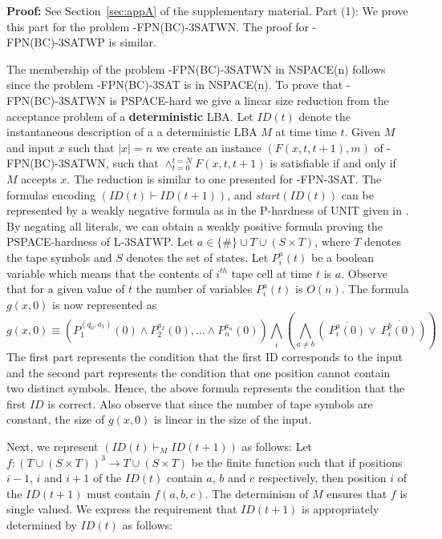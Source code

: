 \noindent
{\bf Proof:} See Section~\ref{sec:appA} of the supplementary material.
\iffalse
Part (1):
We prove  this part for the problem {-FPN(BC)-3SATWN}. 
The proof for {-FPN(BC)-3SATWP} is similar.


The membership of the problem {-FPN(BC)-3SATWN} in {\sf NSPACE(n)} 
follows since the problem {-FPN(BC)-3SAT} is in {\sf NSPACE(n)}.  
To prove that {-FPN(BC)-3SATWN} is {\sf PSPACE}-hard we give a linear size
reduction from the acceptance problem of a {\bf deterministic} {\sf LBA}.
Let $ID(t)$ denote the  instantaneous description of a
a deterministic {\sf LBA} $M$ at time time $t$.
Given $M$ and input $x$ such that $|x| = n$ we create
an instance $(F(x,t,t+1),m)$ of {-FPN(BC)-3SATWN}, such that 
$\wedge_{t = 0}^{t = N} F(x, t, t+1)$ is 
satisfiable if and only if $M$ accepts $x$. 
The reduction is similar to one presented for  {-FPN-3SAT}. 
The formulas encoding $(ID(t) \vdash ID(t+1))$, and $start(ID(t))$
can  be represented by a weakly negative formula
as in the {\sf P}-hardness of {\sf UNIT} given in \cite{JL77}. 
By negating all literals, we can 
obtain a weakly positive formula proving the {\sf PSPACE}-hardness of 
{\sf L-3SATWP}. Let $a \in \{ \# \} \cup T \cup  (S \times T)$, where 
$T$ denotes the tape symbols and $S$ denotes the set of states. 
Let $P^a_i(t)$ be a boolean variable which means that the contents
of $i^{th}$ tape cell at time $t$ is $a$. Observe that for a given value of $t$
the number of variables $P^a_i(t)$ is $O(n)$. 
The formula $g(x,0)$ is now represented as
\[g(x, 0) \equiv 
\left( P_{1}^{(q_0,a_1)}(0) \wedge P_{2}^{a_2}(0),\ldots \wedge 
P_{n}^{a_n}(0) \right) \bigwedge_{i} \left(\bigwedge_{a \neq b} 
(~\overline{P_{i}^a(0)} \vee  ~\overline{P_{i}^b(0)}) \right)\]
The first part represents the condition that the first ID corresponds to the
input and the second part represents the condition that one position
cannot contain two distinct symbols. Hence, the above formula represents the
condition that the first $ID$ is correct.  Also observe that since the number 
of tape symbols are constant, the size of $g(x,0)$ is linear in the size of 
the input.

Next, we represent  $(ID(t) {\vdash}_M ID(t+1))$
as follows:
Let $f:(T \cup (S \times T))^3 \rightarrow T \cup (S \times T)$ be the finite
function such that if positions $i-1$, $i$ and $i+1$ of the $ID(t)$ 
contain $a$, $b$ and $c$ respectively, then position $i$ of the $ID(t+1)$ 
must contain $f(a,b,c)$. The determinism of $M$ ensures that
$f$ is single valued. We express the requirement that $ID(t+1)$ 
is appropriately  determined by $ID(t)$ as follows:


